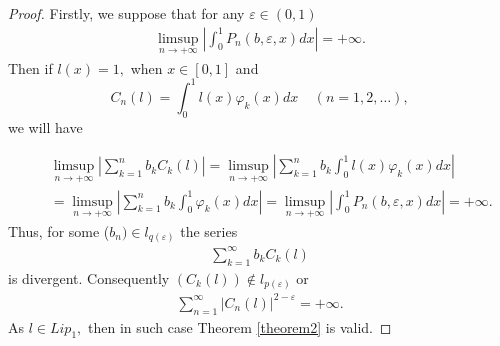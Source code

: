 \documentclass[10pt,a4paper]{amsart}
\begin{document}
	\begin{proof}
		Firstly, we suppose that for any $\varepsilon \in (0,1)$
		\begin{eqnarray*}
			\limsup_{n \rightarrow +\infty} \left|\int_{0}^{1} P_n (b, \varepsilon, x) dx\right| =+ \infty.
		\end{eqnarray*} 
		Then if $l(x)=1,$ when $x\in [0,1]$ and $$C_n(l)=\int_{0}^{1}l(x) \varphi_{k}(x) dx \ \ \ \ \ (n=1,2, \dots),$$
		we will have	
		
		\begin{eqnarray*}
			&&\limsup_{n \rightarrow +\infty} \left|\sum_{k=1}^{n} b_k C_k (l)\right| = \limsup_{n \rightarrow +\infty} \left|\sum_{k=1}^{n} b_k \int_{0}^{1}l(x) \varphi_{k}(x) dx \right| \\
			&&=  \limsup_{n \rightarrow +\infty}  \left|\sum_{k=1}^{n} b_k \int_{0}^{1} \varphi_{k}(x) dx \right| = \limsup_{n \rightarrow +\infty} \left|\int_{0}^{1} P_n (b, \varepsilon, x) dx\right| =+ \infty.
		\end{eqnarray*}
		Thus, for some ($b_n) \in l_{q(\varepsilon)}$ the series	
		\begin{eqnarray*}
			\sum_{k=1}^{\infty} b_k C_k (l)
		\end{eqnarray*}
		is divergent. Consequently $(C_k (l)) \notin l_{p(\varepsilon)}$ or 
		\begin{eqnarray*}
			\sum_{n=1}^{\infty} \left|C_n(l)\right|^{2-\varepsilon} =+\infty.
		\end{eqnarray*}
		As $l \in Lip_1,$ then in such case Theorem \ref{theorem2} is valid.
		

\end{proof}
\end{document}
